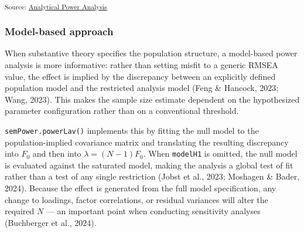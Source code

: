 \documentclass[
  letterpaper,
  DIV=11,
  numbers=noendperiod]{scrartcl}
\begin{document}
\textsubscript{Source:
\href{https://phdpablo.github.io/cfa-power/Scripts/AnalysisScripts/02_analytical_power-preview.html\#cell-fig-apriori-rmsea}{Analytical
Power Analysis}}

\subsubsection{Model-based approach}\label{model-based-approach}

When substantive theory specifies the population structure, a
model-based power analysis is more informative: rather than setting
misfit to a generic RMSEA value, the effect is implied by the
discrepancy between an explicitly defined population model and the
restricted analysis model (Feng \& Hancock, 2023; Wang, 2023). This
makes the sample size estimate dependent on the hypothesized parameter
configuration rather than on a conventional threshold.

\texttt{semPower.powerLav()} implements this by fitting the null model
to the population-implied covariance matrix and translating the
resulting discrepancy into \(F_0\) and then into
\(\lambda = (N - 1)F_0\). When \texttt{modelH1} is omitted, the null
model is evaluated against the saturated model, making the analysis a
global test of fit rather than a test of any single restriction (Jobst
et al., 2023; Moshagen \& Bader, 2024). Because the effect is generated
from the full model specification, any change to loadings, factor
correlations, or residual variances will alter the required \(N\) --- an
important point when conducting sensitivity analyses (Buchberger et al.,
2024).
\end{document}
